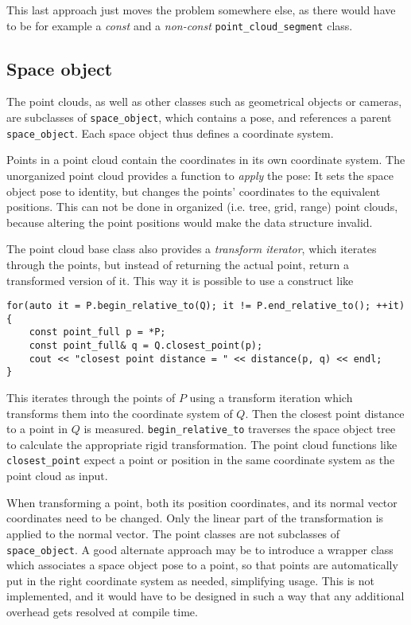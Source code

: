 This last approach just moves the problem somewhere else, as there would have to be for example a \emph{const} and a \emph{non-const} \verb&point_cloud_segment& class.


\subsection{Space object}
The point clouds, as well as other classes such as geometrical objects or cameras, are subclasses of \verb&space_object&, which contains a pose, and references a parent \verb&space_object&. Each space object thus defines a coordinate system.

Points in a point cloud contain the coordinates in its own coordinate system. The unorganized point cloud provides a function to \emph{apply} the pose: It sets the space object pose to identity, but changes the points' coordinates to the equivalent positions. This can not be done in organized (i.e. tree, grid, range) point clouds, because altering the point positions would make the data structure invalid.

The point cloud base class also provides a \emph{transform iterator}, which iterates through the points, but instead of returning the actual point, return a transformed version of it. This way it is possible to use a construct like
\begin{lstlisting}
for(auto it = P.begin_relative_to(Q); it != P.end_relative_to(); ++it) {
	const point_full p = *P;
	const point_full& q = Q.closest_point(p); 
	cout << "closest point distance = " << distance(p, q) << endl;
}
\end{lstlisting}
This iterates through the points of $P$ using a transform iteration which transforms them into the coordinate system of $Q$. Then the closest point distance to a point in $Q$ is measured. \verb&begin_relative_to& traverses the space object tree to calculate the appropriate rigid transformation. The point cloud functions like \verb&closest_point& expect a point or position in the same coordinate system as the point cloud as input.

When transforming a point, both its position coordinates, and its normal vector coordinates need to be changed. Only the linear part of the transformation is applied to the normal vector. The point classes are not subclasses of \verb&space_object&. A good alternate approach may be to introduce a wrapper class which associates a space object pose to a point, so that points are automatically put in the right coordinate system as needed, simplifying usage. This is not implemented, and it would have to be designed in such a way that any additional overhead gets resolved at compile time.

